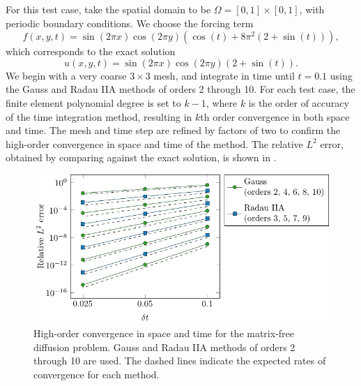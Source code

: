 \documentclass[review]{siamart}
\begin{document}
For this test case, take the spatial domain to be $\Omega = [0,1] \times [0,1]$, with periodic boundary conditions.
We choose the forcing term
\[
	f(x, y, t) = \sin (2\pi x)\cos(2\pi y) \left(\cos(t) + 8 \pi^2 (2 + \sin(t)) \right),
\]
which corresponds to the exact solution
\[
	u(x, y, t) = \sin(2\pi x)\cos(2\pi y)(2 + \sin(t)).
\]
We begin with a very coarse $3 \times 3$ mesh, and integrate in time until $t=0.1$ using the Gauss and Radau IIA methods of orders 2 through 10.
For each test case, the finite element polynomial degree is set to $k-1$, where $k$ is the order of accuracy of the time integration method, resulting in $k$th order convergence in both space and time.
The mesh and time step are refined by factors of two to confirm the high-order convergence in space and time of the method.
The relative $L^2$ error, obtained by comparing against the exact solution, is shown in .

\begin{figure}[!ht]
	\centering
	\includegraphics{figures/high_order_diff_error_plot/ho_diff_errors}
	\caption{
		High-order convergence in space and time for the matrix-free diffusion problem.
		Gauss and Radau IIA methods of orders 2 through 10 are used.
		The dashed lines indicate the expected rates of convergence for each method.
	}
	\label{fig:high-order-diff-errors}
\end{figure}
\end{document}
